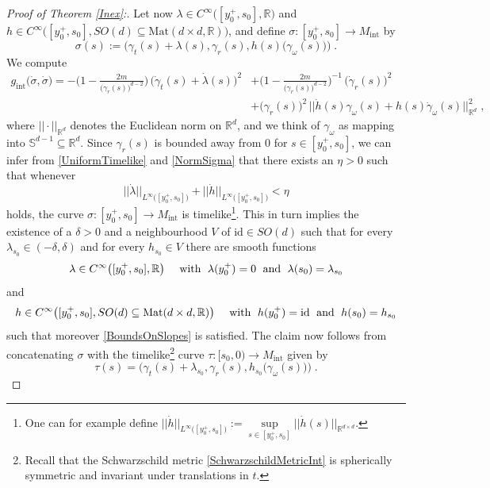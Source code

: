 \documentclass[reqno]{article}
\newcommand{\R}{\mathbb{R}}
\newcommand{\Sd}{\mathbb{S}^{d-1}}
\newcommand{\Mint}{M_{\mathrm{int}}}
\newcommand{\gint}{g_{\mathrm{int}}}
\begin{document}
\begin{proof}[Proof of Theorem \ref{Inex}:]
Let now $\lambda \in C^\infty\big( [y^+_0,s_0], \R\big)$ and $ h \in C^\infty\big([y^+_0,s_0], SO(d) \subseteq \mathrm{Mat}(d \times d, \R)\big)$, and define $\sigma : [y^+_0,s_0] \to \Mint$ by
\begin{equation*}
\sigma(s) := \Big(\gamma_t(s) + \lambda(s), \gamma_r(s), h(s)\big(\gamma_\omega(s)\big)\Big) \;.
\end{equation*}
We compute
\begin{equation}
\label{NormSigma}
\begin{split}
\gint\big(\dot{\sigma},\dot{\sigma}\big) = - \Big(1 - \frac{2m}{\big(\gamma_r(s)\big)^{d-2}}\Big)\, \big(\dot{\gamma}_t(s) + \dot{\lambda}(s)\big)^2 &+ \Big(1 - \frac{2m}{\big(\gamma_r(s)\big)^{d-2}}\Big)^{-1} \, \big(\dot{\gamma}_r(s)\big)^2 \\
&+ \big(\gamma_r(s)\big)^2 \, \big|\big|\dot{h}(s) \gamma_\omega(s) + h(s) \dot{\gamma}_\omega(s)\big|\big|^2_{\R^d} \;,
\end{split}
\end{equation}
where $|| \cdot ||_{\R^d}$ denotes the Euclidean norm on $\R^d$, and we think of $\gamma_\omega$ as mapping into $\Sd \subseteq \R^d$.
Since $\gamma_r(s)$ is bounded away from $0$ for $s \in [y^+_0, s_0]$, we can infer from \eqref{UniformTimelike} and \eqref{NormSigma} that there exists an $\eta >0$ such that whenever 
\begin{equation}
\label{BoundsOnSlopes}
||\dot{\lambda}||_{L^\infty\big([y^+_0,s_0]\big)} + ||\dot{h}||_{L^\infty\big([y^+_0,s_0]\big)} < \eta
\end{equation}
holds, the curve $\sigma : [y^+_0,s_0] \to \Mint$ is timelike\footnote{One can for example define $||\dot{h}||_{L^\infty\big([y^+_0,s_0]\big)} := \sup\limits_{s \in [y^+_0,s_0]} ||\dot{h}(s)||_{\R^{d\times d}}$.}. This in turn implies the existence of a $\delta >0$ and a neighbourhood $V$ of $\mathrm{id} \in SO(d)$ such that for every $\lambda_{s_0} \in (-\delta, \delta)$ and for every $h_{s_0} \in V$ there are smooth functions 
\begin{equation*}
\lambda \in C^\infty\big( [y^+_0,s_0], \R\big) \quad \textnormal{ with } \; \lambda(y^+_0) = 0 \; \textnormal{ and } \; \lambda(s_0) = \lambda_{s_0}
\end{equation*}
and
\begin{equation*}
h \in C^\infty\big([y^+_0,s_0], SO(d) \subseteq \mathrm{Mat}(d \times d, \R)\big) \quad \textnormal{ with }\; h(y^+_0) = \mathrm{id} \; \textnormal{ and } \; h(s_0) = h_{s_0}
\end{equation*}
such that moreover \eqref{BoundsOnSlopes} is satisfied. The claim now follows from concatenating $\sigma$ with the timelike\footnote{Recall that the Schwarzschild metric \eqref{SchwarzschildMetricInt} is spherically symmetric and invariant under translations in $t$.} curve  $\tau : [s_0, 0) \to \Mint$ given by
\begin{equation*}
\tau(s) = \Big(\gamma_t(s) + \lambda_{s_0}, \gamma_r(s), h_{s_0} \big(\gamma_\omega(s)\big)\Big) \;.
\end{equation*}


\end{proof}
\end{document}
